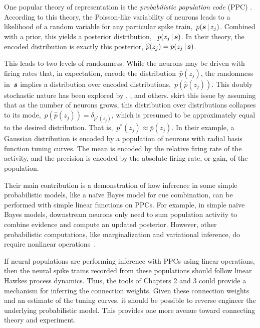 One popular theory of representation is the \emph{probabilistic
  population code} (PPC) \cite{Ma2006}. According to this theory, the
Poisson-like variability of neurons leads to a likelihood of a random
variable for any particular spike train,~$p(\boldsymbol{s} \,|\, z_j)$.
Combined with a prior, this yields a posterior distribution,
~$p(z_j \,|\, \boldsymbol{s})$. In their theory, the encoded distribution is
exactly this posterior, $\widehat{p}(z_j) = p(z_j \,|\, \boldsymbol{s})$.

This leads to two levels of randomness. While
the neurons may be driven with firing rates that, in expectation,
encode the distribution~$\bar{p}(z_j)$, the randomness in~$\boldsymbol{s}$ implies
a distribution over encoded distributions,~$p(\widehat{p}(z_j))$. This doubly
stochastic nature has been explored by \citet{Zemel1998},
\citet{Sahani2003}, and others. \citet{Ma2006} skirt this issue by
assuming that as the number of neurons grows, this distribution over
distributions collapses to its mode,~$p(\widehat{p}(z_j)) = \delta_{p^*(z_j)}$,
which is presumed to be approximately equal to the desired distribution.
That is,~$p^*(z_j) \approx \bar{p}(z_j)$. In their example, a Gaussian
distribution is encoded by a population of neurons with radial
basis function tuning curves. The mean is encoded by the relative
firing rate of the activity, and the precision is encoded by the
absolute firing rate, or gain, of the population.

Their main contribution is a demonstration of how inference in some
simple probabilistic models, like a na\"ive Bayes model for cue
combination, can be performed with simple linear functions on
PPCs. For example, in simple na\"ive Bayes models, downstream neurons
only need to sum population activity to combine evidence and compute
an updated posterior. However, other probabilistic computations, like
marginalization and variational inference, do require nonlinear
operations~\cite{Beck2011, Beck2012}.

If neural populations are performing inference with PPCs using linear
operations, then the neural spike trains recorded from these
populations should follow linear Hawkes process dynamics.  Thus, the
tools of Chapters 2 and 3 could provide a mechanism for inferring the
connection weights.  Given these connection weights and an estimate of
the tuning curves, it should be possible to reverse engineer the
underlying probabilistic model. This provides one more avenue toward
connecting theory and experiment.


